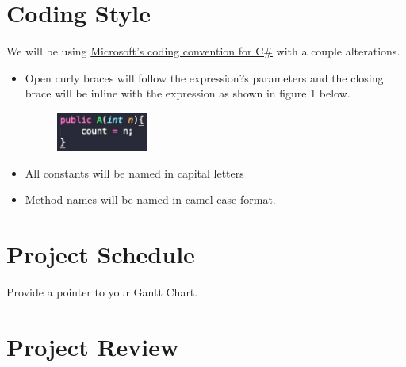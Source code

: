 \documentclass{article}
\begin{document}
\section{Coding Style}
We will be using \href{https://msdn.microsoft.com/en-us/library/ff926074.aspx}{Microsoft's coding convention for C\#} with a couple alterations.
\begin{itemize}

  \item Open curly braces will follow the expression?s parameters and the closing brace will be inline with the expression as shown in figure 1 below.

\begin{figure}[H]
\centering
  \includegraphics[width=30mm,scale = 0.25]{curlyBraces.jpg}
\end{figure}

  \item All constants will be named in capital letters

  \item Method names will be named in camel case format.

\end{itemize}

\section{Project Schedule}

Provide a pointer to your Gantt Chart.

\section{Project Review}
\end{document}
